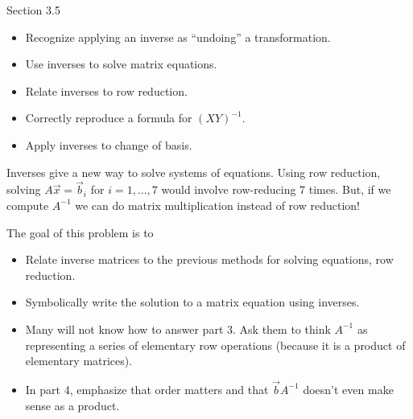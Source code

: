 \documentclass{problemset}
\newcommand{\bookonlynewpage}{\begin{bookonly}\newpage\end{bookonly}}
\begin{document}
\begin{lesson}

	Section 3.5

	\begin{itemize}
		\item Recognize applying an inverse as ``undoing'' a transformation.
		\item Use inverses to solve matrix equations.
		\item Relate inverses to row reduction.
		\item Correctly reproduce a formula for $(XY)^{-1}$.
		\item Apply inverses to change of basis.
	\end{itemize}

	Inverses give a new way to solve systems of equations. Using row reduction, solving $A\vec x=\vec b_i$ for $i=1,\ldots, 7$
	would involve row-reducing 7 times. But, if we compute $A^{-1}$ we can do matrix multiplication instead of row reduction!


\end{lesson}
	\bookonlynewpage
	\question
	\begin{annotation}
		\begin{goals}

			The goal of this problem is to
			\begin{itemize}
				\item Relate inverse matrices to the previous methods for solving
					equations, row reduction.
				\item Symbolically write the solution to a matrix equation using inverses.
			\end{itemize}
		\end{goals}

		\begin{notes}
			\begin{itemize}
				\item Many will not know how to answer part 3. Ask them
					to think $A^{-1}$ as representing a series of elementary row
					operations (because it is a product of elementary matrices).
				\item In part 4, emphasize that order matters and that $\vec bA^{-1}$ doesn't
					even make sense as a product.
			\end{itemize}
		\end{notes}
	\end{annotation}
\end{document}

